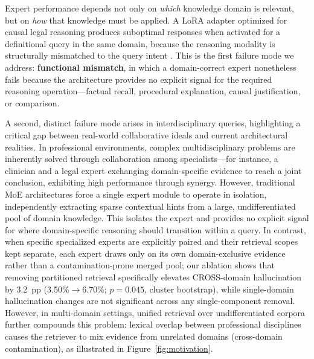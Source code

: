 \documentclass[a4paper,fleql]{cas-sc}
\begin{document}
Expert performance depends not only on \textit{which} knowledge domain is
relevant, but on \textit{how} that knowledge must be applied. A LoRA adapter
optimized for causal legal reasoning produces suboptimal responses when
activated for a definitional query in the same domain, because the reasoning
modality is structurally mismatched to the query intent \citep{singhal2023large,guha2023legalbench}.
This is the first failure mode we address: \textbf{functional mismatch}, in
which a domain-correct expert nonetheless fails because the architecture provides
no explicit signal for the required reasoning operation---factual recall,
procedural explanation, causal justification, or comparison.

A second, distinct failure mode arises in interdisciplinary queries, highlighting a critical gap between real-world collaborative ideals and current architectural realities. In professional environments, complex multidisciplinary problems are inherently solved through collaboration among specialists---for instance, a clinician and a legal expert exchanging domain-specific evidence to reach a joint conclusion, exhibiting high performance through synergy. However, traditional MoE architectures force a single expert module to operate in isolation, independently extracting sparse contextual hints from a large, undifferentiated pool of domain knowledge. This isolates the expert and provides no explicit signal for where domain-specific reasoning should transition within a query.
In contrast, when specific specialized experts are explicitly paired and
their retrieval scopes kept separate, each expert draws only on its own
domain-exclusive evidence rather than a contamination-prone merged pool;
our ablation shows that removing partitioned retrieval specifically
elevates CROSS-domain hallucination by 3.2~pp (3.50\%$\to$6.70\%; $p{=}0.045$,
cluster bootstrap), while single-domain hallucination changes are not significant
across any single-component removal. However, in
multi-domain settings, unified retrieval over undifferentiated corpora
further compounds this problem: lexical overlap between professional
disciplines causes the retriever to mix evidence from unrelated domains
(cross-domain contamination), as illustrated in
Figure~\ref{fig:motivation}.
\end{document}
